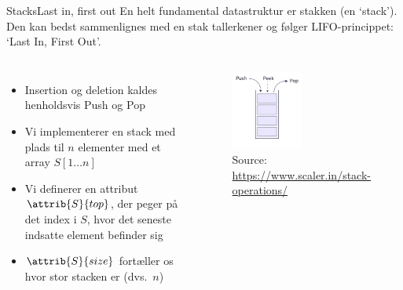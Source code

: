 \documentclass[aspectratio=1610]{beamer}
\begin{document}
\begin{frame}{Stacks}{Last in, first out}
    En helt fundamental datastruktur er \alert{stakken} (en `stack'). Den kan
    bedst sammenlignes med en stak tallerkener og følger
    \alert{LIFO}-princippet: `Last In, First Out'.

    \begin{columns}
        \begin{itemize}
            \item Insertion og deletion kaldes henholdsvis \alert{Push} og
                \alert{Pop}
            \item Vi implementerer en stack med plads til $n$ elementer med et
                array $S[1\ldots n]$
            \item Vi definerer en attribut $\attrib{S}{top}$, der peger på det
                index i $S$, hvor det seneste indsatte element befinder sig
            \item $\attrib{S}{size}$ fortæller os hvor stor stacken er (dvs.\ $n$)
        \end{itemize}
    

        \begin{figure}[h]
            \centering
            \includegraphics[width=0.5\textwidth]{stack}
            \caption{Source: \url{https://www.scaler.in/stack-operations/}}
        \end{figure}

    \end{columns}
\end{frame}
\end{document}
